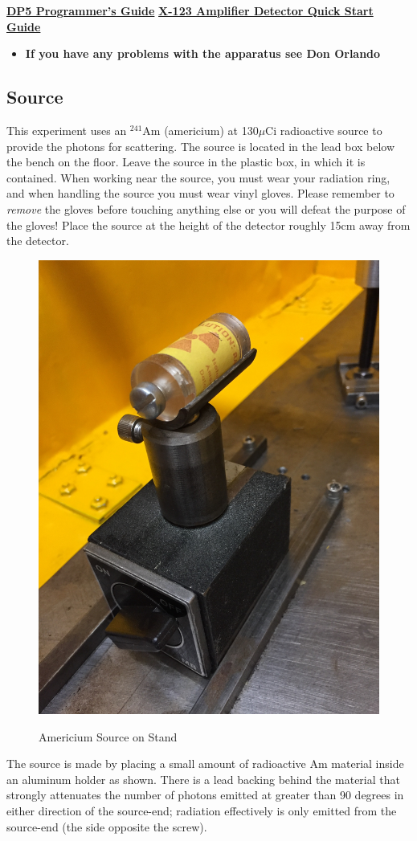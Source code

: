 \documentclass{../lab}
\begin{document}
\href{http://experimentationlab.berkeley.edu/sites/default/files/images/DP5\_Programmers\_Guide\_A4.pdf}{\textbf{DP5 Programmer's Guide}} \href{http://experimentationlab.berkeley.edu/sites/default/files/images/X-123.pdf}{\textbf{X-123 Amplifier Detector Quick Start Guide}}

\begin{itemize}
    \item \textbf{If you have any problems with the apparatus see Don Orlando}
\end{itemize}

\subsection{Source}

This experiment uses an $^{241}$Am (americium) at 130$\mu$Ci radioactive source to provide the photons for scattering. The source is located in the lead box below the bench on the floor. Leave the source in the plastic box, in which it is contained. When working near the source, you must wear your radiation ring, and when handling the source you must wear vinyl gloves. Please remember to \emph{remove }the gloves before touching anything else or you will defeat the purpose of the gloves! Place the source at the height of the detector roughly 15cm away from the detector.

\begin{figure}[h]
    \centering
    \href{http://experimentationlab.berkeley.edu/sites/default/files/images/COMSource.JPG}{\includegraphics[width=0.37\linewidth]{images/COMSource.JPG}}
    \caption{Americium Source on Stand}
    \label{COMSource}
\end{figure}

The source is made by placing a small amount of radioactive Am material inside an aluminum holder as shown. There is a lead backing behind the material that strongly attenuates the number of photons emitted at greater than 90 degrees in either direction of the source-end; radiation effectively is only emitted from the source-end (the side opposite the screw).
\end{document}
